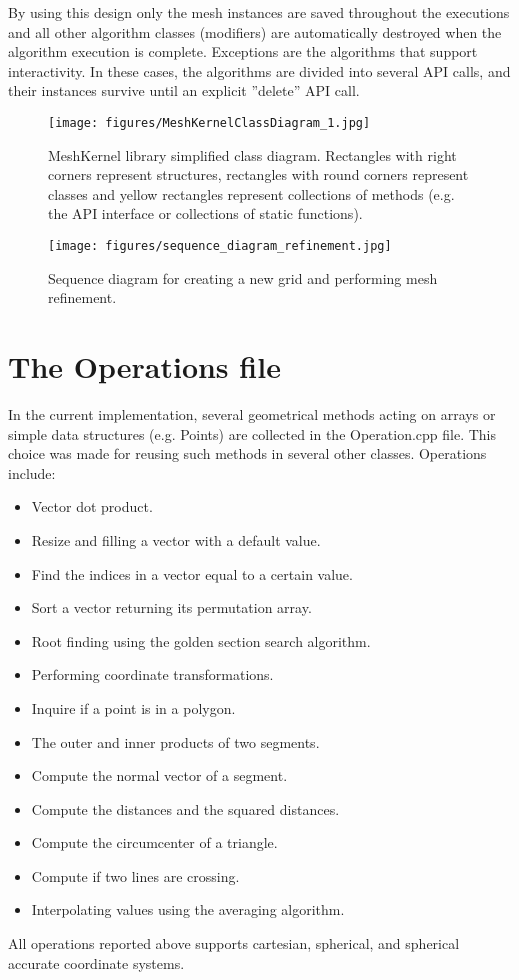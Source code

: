 \documentclass[biblatex]{deltares_manual}
\begin{document}
By using this design only the mesh instances are saved throughout the executions and all other algorithm classes (modifiers) are automatically destroyed when the algorithm execution is complete. Exceptions are the algorithms that support interactivity. In these cases, the algorithms are divided into several API calls, and their instances survive until an explicit ''delete'' API call.

\begin{figure}[H]
	\centering
	\texttt{[image: figures/MeshKernelClassDiagram\_1.jpg]}
	\caption{MeshKernel library simplified class diagram. Rectangles with right corners represent structures, rectangles with round corners represent classes and yellow rectangles represent collections of methods (e.g. the API interface or collections of static functions).}
	\label{fig:classDiagram}
\end{figure}
\begin{figure}[H]
	\centering
	\texttt{[image: figures/sequence\_diagram\_refinement.jpg]}
	\caption{Sequence diagram for creating a new grid and performing mesh refinement.}
	\label{fig:sequenceDiagram}
\end{figure}

\chapter{The Operations file}

In the current implementation, several geometrical methods acting on arrays or simple data structures (e.g. Points) are collected in the Operation.cpp file. This choice was made for reusing such methods in several other classes. Operations include:
\begin{itemize}
\item Vector dot product.
\item Resize and filling a vector with a default value.
\item Find the indices in a vector equal to a certain value.
\item Sort a vector returning its permutation array.
\item Root finding using the golden section search algorithm.
\item Performing coordinate transformations.
\item Inquire if a point is in a polygon.
\item The outer and inner products of two segments.
\item Compute the normal vector of a segment.
\item Compute the distances and the squared distances.
\item Compute the circumcenter of a triangle.
\item Compute if two lines are crossing.
\item Interpolating values using the averaging algorithm.
\end{itemize}
All operations reported above supports cartesian, spherical, and spherical accurate coordinate systems.
\end{document}
